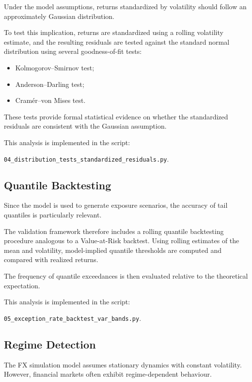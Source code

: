 Under the model assumptions, returns standardized by volatility should follow an approximately Gaussian distribution.

To test this implication, returns are standardized using a rolling volatility estimate, and the resulting residuals are tested against the standard normal distribution using several goodness-of-fit tests:

\begin{itemize}
	
	\item Kolmogorov--Smirnov test;
	\item Anderson--Darling test;
	\item Cramér--von Mises test.
	
\end{itemize}

These tests provide formal statistical evidence on whether the standardized residuals are consistent with the Gaussian assumption.

This analysis is implemented in the script:

\texttt{04\_distribution\_tests\_standardized\_residuals.py}.

\subsection{Quantile Backtesting}

Since the model is used to generate exposure scenarios, the accuracy of tail quantiles is particularly relevant.

The validation framework therefore includes a rolling quantile backtesting procedure analogous to a Value-at-Risk backtest. Using rolling estimates of the mean and volatility, model-implied quantile thresholds are computed and compared with realized returns.

The frequency of quantile exceedances is then evaluated relative to the theoretical expectation.

This analysis is implemented in the script:

\texttt{05\_exception\_rate\_backtest\_var\_bands.py}.

\subsection{Regime Detection}

The FX simulation model assumes stationary dynamics with constant volatility. However, financial markets often exhibit regime-dependent behaviour.

